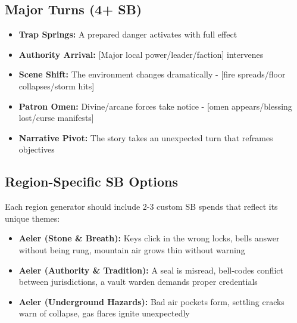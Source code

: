 \subsection*{Major Turns (4+ SB)}
\begin{itemize}
\item \textbf{Trap Springs:} A prepared danger activates with full effect
\item \textbf{Authority Arrival:} [Major local power/leader/faction] intervenes
\item \textbf{Scene Shift:} The environment changes dramatically - [fire spreads/floor collapses/storm hits]
\item \textbf{Patron Omen:} Divine/arcane forces take notice - [omen appears/blessing lost/curse manifests]
\item \textbf{Narrative Pivot:} The story takes an unexpected turn that reframes objectives
\end{itemize}

\subsection*{Region-Specific SB Options}
Each region generator should include 2-3 custom SB spends that reflect its unique themes:

\begin{itemize}
\item \textbf{Aeler (Stone \& Breath):} Keys click in the wrong locks, bells answer without being rung, mountain air grows thin without warning
\item \textbf{Aeler (Authority \& Tradition):} A seal is misread, bell-codes conflict between jurisdictions, a vault warden demands proper credentials
\item \textbf{Aeler (Underground Hazards):} Bad air pockets form, settling cracks warn of collapse, gas flares ignite unexpectedly
\end{itemize}
